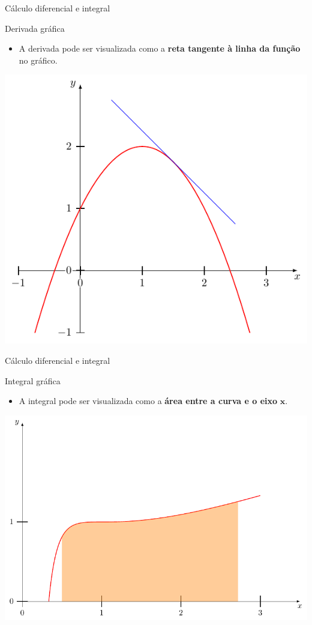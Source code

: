 \begin{frame}{Cálculo diferencial e integral}
	\begin{block}{Derivada gráfica}
		\begin{itemize}
			\item A derivada pode ser visualizada como a \textbf{reta tangente à linha da função} no gráfico.
		\end{itemize}
	\end{block}

	\centering
	\includegraphics[width=0.5\linewidth]{Figuras/Ch13/der2}

\end{frame}


\begin{frame}{Cálculo diferencial e integral}
	\begin{block}{Integral gráfica}
		\begin{itemize}
			\item A integral pode ser visualizada como a \textbf{área entre a curva e o eixo} $ \bm{x} $.
		\end{itemize}
	\end{block}

	\centering
	\includegraphics[width=0.7\linewidth]{Figuras/Ch13/int2}
	
\end{frame}


